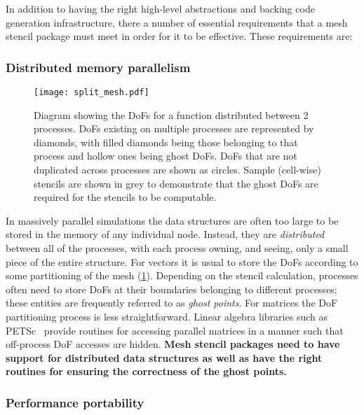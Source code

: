 \documentclass[thesis]{subfiles}
\begin{document}
In addition to having the right high-level abstractions and backing code generation infrastructure, there a number of essential requirements that a mesh stencil package must meet in order for it to be effective.
These requirements are:


\subsubsection{Distributed memory parallelism}
\label{sec:intro_parallelism}

\begin{figure}
  \centering
  \texttt{[image: split\_mesh.pdf]}
  \caption{
    Diagram showing the DoFs for a function distributed between 2 processes.
    DoFs existing on multiple processes are represented by diamonds, with filled diamonds being those belonging to that process and hollow ones being ghost DoFs.
    DoFs that are not duplicated across processes are shown as circles.
    Sample (cell-wise) stencils are shown in grey to demonstrate that the ghost DoFs are required for the stencils to be computable.
  }
  \label{fig:pyop2_split_mesh}
\end{figure}

In massively parallel simulations the data structures are often too large to be stored in the memory of any individual node.
Instead, they are \textit{distributed} between all of the processes, with each process owning, and seeing, only a small piece of the entire structure.
For vectors it is usual to store the DoFs according to some partitioning of the mesh (\cref{fig:pyop2_split_mesh}).
Depending on the stencil calculation, processes often need to store DoFs at their boundaries belonging to different processes; these entities are frequently referred to as \textit{ghost points}.
For matrices the DoF partitioning process is less straightforward.
Linear algebra libraries such as PETSc~\cite{petsc-user-ref,petsc-web-page,petsc-efficient} provide routines for accessing parallel matrices in a manner such that off-process DoF accesses are hidden.
\textbf{Mesh stencil packages need to have support for distributed data structures as well as have the right routines for ensuring the correctness of the ghost points.}

\subsubsection{Performance portability}
\end{document}
